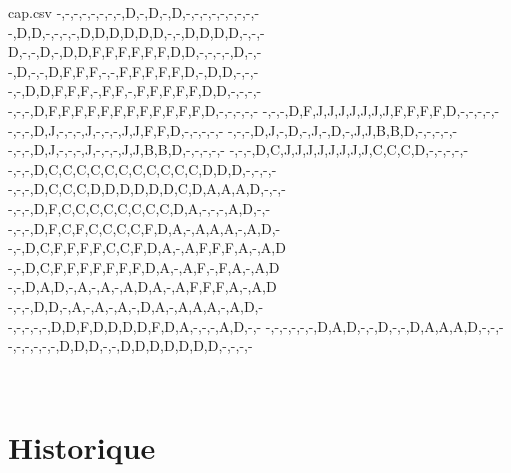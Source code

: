 \documentclass{article}
\begin{document}
\begin{codesortie}
\begin{filecontents*}[overwrite]{cap.csv}
-,-,-,-,-,-,-,-,D,-,D,-,D,-,-,-,-,-,-,-,-,-
-,D,D,-,-,-,-,D,D,D,D,D,D,-,-,D,D,D,D,-,-,-
D,-,-,D,-,D,D,F,F,F,F,F,F,D,D,-,-,-,-,D,-,-
-,D,-,-,D,F,F,F,-,-,F,F,F,F,F,D,-,D,D,-,-,-
-,-,D,D,F,F,F,-,F,F,-,F,F,F,F,F,D,D,-,-,-,-
-,-,-,D,F,F,F,F,F,F,F,F,F,F,F,F,D,-,-,-,-,-
-,-,-,D,F,J,J,J,J,J,J,J,F,F,F,F,D,-,-,-,-,-
-,-,-,D,J,-,-,-,J,-,-,-,J,J,F,F,D,-,-,-,-,-
-,-,-,D,J,-,D,-,J,-,D,-,J,J,B,B,D,-,-,-,-,-
-,-,-,D,J,-,-,-,J,-,-,-,J,J,B,B,D,-,-,-,-,-
-,-,-,D,C,J,J,J,J,J,J,J,J,C,C,C,D,-,-,-,-,-
-,-,-,D,C,C,C,C,C,C,C,C,C,C,C,D,D,D,-,-,-,-
-,-,-,D,C,C,C,D,D,D,D,D,D,C,D,A,A,A,D,-,-,-
-,-,-,D,F,C,C,C,C,C,C,C,C,D,A,-,-,-,A,D,-,-
-,-,-,D,F,C,F,C,C,C,C,F,D,A,-,A,A,A,-,A,D,-
-,-,D,C,F,F,F,F,C,C,F,D,A,-,A,F,F,F,A,-,A,D
-,-,D,C,F,F,F,F,F,F,F,D,A,-,A,F,-,F,A,-,A,D
-,-,D,A,D,-,A,-,A,-,A,D,A,-,A,F,F,F,A,-,A,D
-,-,-,D,D,-,A,-,A,-,A,-,D,A,-,A,A,A,-,A,D,-
-,-,-,-,-,D,D,F,D,D,D,D,F,D,A,-,-,-,A,D,-,-
-,-,-,-,-,-,D,A,D,-,-,D,-,-,D,A,A,A,D,-,-,-
-,-,-,-,-,-,D,D,D,-,-,D,D,D,D,D,D,D,-,-,-,-
\end{filecontents*}

\begin{center}
	\begin{tikzpicture}[x=0.35cm,y=0.35cm]
		\PLpixelart[codes=ABCDFJ,symboles={1,2,3,4,6,10},symb,style=\tiny\sffamily]{cap.csv}
	\end{tikzpicture}
	~~
	\begin{tikzpicture}[x=0.35cm,y=0.35cm]
		\PLpixelart[codes=ABCDFJ,couleurs={Red,Brown,Yellow,Black,Blue,Gray},correction]{cap.csv}
	\end{tikzpicture}
\end{center}
\end{codesortie}

\newpage

\section{Historique}
\end{document}
